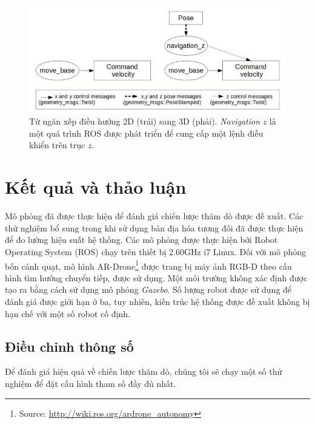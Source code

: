 \documentclass[11pt,openany]{book}
\begin{document}
\begin{figure}[H]
    \centering
    \includegraphics[scale=0.4]{assets/3_10.png}
    \caption{Từ ngăn xếp điều hướng 2D (trái) sang 3D (phải). \textit{Navigation} $z$ là một quá trình ROS được phát triển để cung cấp một lệnh điều khiển trên trục $z$.}
    \label{fig:3.10}
\end{figure}
\section{Kết quả và thảo luận}
Mô phỏng đã được thực hiện để đánh giá chiến lược thăm dò được đề xuất. Các thử nghiệm bổ sung trong khi sử dụng bản địa hóa tương đối đã được thực hiện để đo lường hiệu suất hệ thống. Các mô phỏng được thực hiện bởi Robot Operating System (ROS) chạy trên thiết bị 2.60GHz i7 Linux. Đối với mô phỏng bốn cánh quạt, mô hình AR-Drone\footnote{Source: \url{http://wiki.ros.org/ardrone_autonomy}} được trang bị máy ảnh RGB-D theo cấu hình tìm hướng chuyển tiếp, được sử dụng. Một môi trường không xác định được tạo ra bằng cách sử dụng mô phỏng \textit{Gazebo}. Số lượng robot được sử dụng để đánh giá được giới hạn ở ba, tuy nhiên, kiến trúc hệ thống được đề xuất không bị hạn chế với một số robot cố định.
\subsection{Điều chỉnh thông số}
Để đánh giá hiệu quả về chiến lược thăm dò, chúng tôi sẽ chạy một số thử nghiệm để đặt cấu hình tham số đầy đủ nhất.
\end{document}
